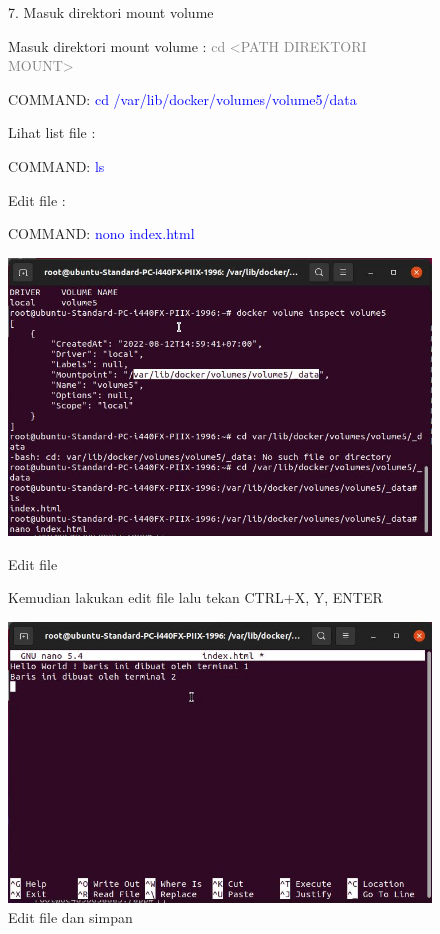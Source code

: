\begin{figure}
    7. Masuk direktori mount volume
    
    Masuk direktori mount volume : \textcolor{Gray}{cd <PATH DIREKTORI MOUNT>}
    
    COMMAND: \textcolor{Blue}{cd /var/lib/docker/volumes/volume5/data}
    
    Lihat list file :
    
    COMMAND: \textcolor{Blue}{ls}
    
    Edit file :
    
    COMMAND: \textcolor{Blue}{nono index.html}
        \begin{center}
            \includegraphics[width=\linewidth]{image/67.jpg}
            \caption{Edit file}
            \label{fig:my_figure}
        \end{center}

    Kemudian lakukan edit file lalu tekan CTRL+X, Y, ENTER
        \begin{center}
            \includegraphics[width=\linewidth]{image/68.jpg}
            \caption{Edit file dan simpan}
            \label{fig:my_figure}
        \end{center}
\end{figure}

